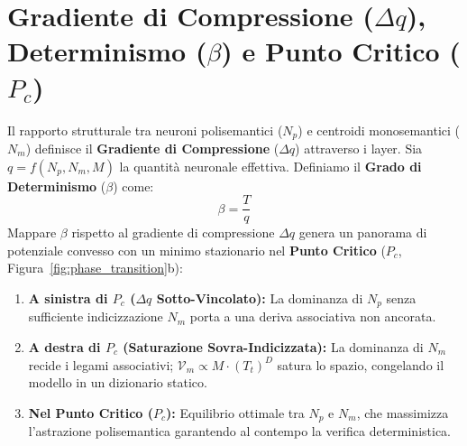 \documentclass[10pt,twocolumn]{article}
\theoremstyle{definition}
\begin{document}
\section{Gradiente di Compressione \texorpdfstring{($\Delta q$)}{(Delta q)}, Determinismo \texorpdfstring{($\beta$)}{(beta)} e Punto Critico \texorpdfstring{($P_c$)}{(Pc)}}
Il rapporto strutturale tra neuroni polisemantici ($N_p$) e centroidi monosemantici ($N_m$) definisce il \textbf{Gradiente di Compressione} ($\Delta q$) attraverso i layer. Sia $q = f(N_p, N_m, M)$ la quantità neuronale effettiva. Definiamo il \textbf{Grado di Determinismo} ($\beta$) come:
\begin{equation}
    \beta = \frac{T}{q}
\end{equation}
Mappare $\beta$ rispetto al gradiente di compressione $\Delta q$ genera un panorama di potenziale convesso con un minimo stazionario nel \textbf{Punto Critico} ($P_c$, Figura~\ref{fig:phase_transition}b):
\begin{enumerate}[leftmargin=*, itemsep=1.5pt, topsep=2pt]
    \item \textbf{A sinistra di $P_c$ ($\Delta q$ Sotto-Vincolato):} La dominanza di $N_p$ senza sufficiente indicizzazione $N_m$ porta a una deriva associativa non ancorata.
    \item \textbf{A destra di $P_c$ (Saturazione Sovra-Indicizzata):} La dominanza di $N_m$ recide i legami associativi; $\mathcal{V}_m \propto M \cdot (T_t)^D$ satura lo spazio, congelando il modello in un dizionario statico.
    \item \textbf{Nel Punto Critico ($P_c$):} Equilibrio ottimale tra $N_p$ e $N_m$, che massimizza l'astrazione polisemantica garantendo al contempo la verifica deterministica.
\end{enumerate}
\end{document}
